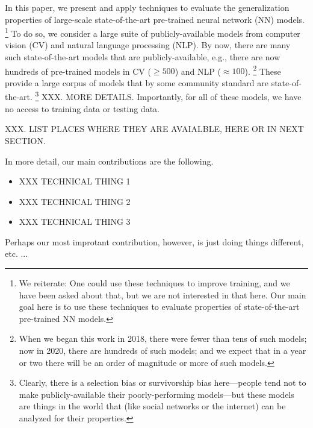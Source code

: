 In this paper, we present and apply techniques to evaluate the generalization properties of large-scale state-of-the-art pre-trained neural network (NN) models.%
\footnote{We reiterate: One could use these techniques to improve training, and we have been asked about that, but we are not interested in that here. Our main goal here is to use these techniques to evaluate properties of state-of-the-art pre-trained NN models.}
To do so, we consider a large suite of publicly-available models from computer vision (CV) and natural language processing (NLP).
%
By now, there are many such state-of-the-art models that are publicly-available, e.g., 
there are now hundreds of pre-trained models in CV ($\ge 500$) and NLP ($\approx 100$).%
\footnote{When we began this work in 2018, there were fewer than tens of such models; now in 2020, there are hundreds of such models; and we expect that in a year or two there will be an order of magnitude or more of such models.}
These provide a large corpus of models that by some community standard are state-of-the-art.%
\footnote{Clearly, there is a selection bias or survivorship bias here---people tend not to make publicly-available their poorly-performing models---but these models are things in the world that (like social networks or the internet) can be analyzed for their properties.}
XXX.  MORE DETAILS.
Importantly, for all of these models, we have no access to training data or testing data.

XXX.  LIST PLACES WHERE THEY ARE AVAIALBLE, HERE OR IN NEXT SECTION.

In more detail, our main contributions are the following.
\begin{itemize}
\item XXX TECHNICAL THING 1
\item XXX TECHNICAL THING 2
\item XXX TECHNICAL THING 3
\end{itemize}
Perhaps our most improtant contribution, however, is just doing things different, etc. ...

